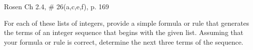 \documentclass[12pt,addpoints]{exam}
\begin{document}
\begin{questions}
\printanswers

\question[12] Rosen Ch 2.4, \# 26(a,c,e,f), p. 169
    \ifprintanswers
        \vspace{-10pt}
   \fi
\begin{solution}
For each of these lists of integers, provide a simple formula or rule that generates the terms of an integer sequence that begins with the given list.  Assuming that your formula or rule is correct, determine the next three terms of the sequence. \\

\begin{parts}

\end{parts}
\end{solution}
\end{questions}
\end{document}
